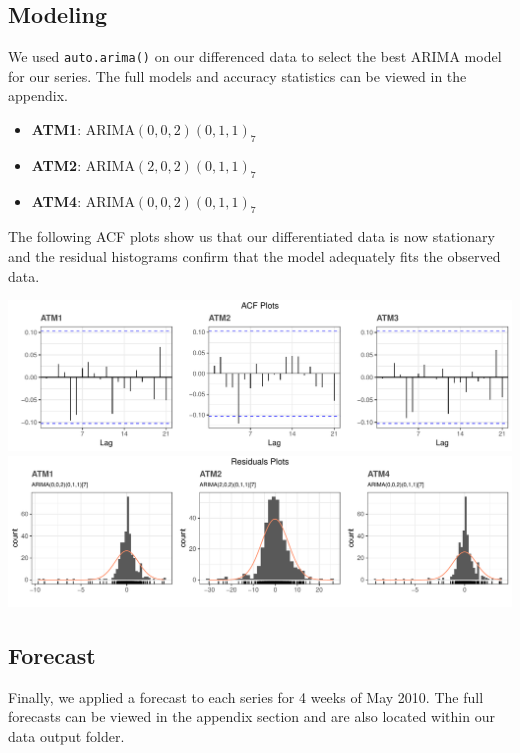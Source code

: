 \documentclass[openany]{book}
\providecommand{\tightlist}{%
  \setlength{\itemsep}{0pt}\setlength{\parskip}{0pt}}
\begin{document}
\hypertarget{modeling}{%
\subsection{Modeling}\label{modeling}}

We used \texttt{auto.arima()} on our differenced data to select the best
ARIMA model for our series. The full models and accuracy statistics can
be viewed in the appendix.

\begin{itemize}
\tightlist
\item
  \textbf{ATM1}: ARIMA\((0,0,2)(0,1,1)_7\)
\item
  \textbf{ATM2}: ARIMA\((2,0,2)(0,1,1)_7\)
\item
  \textbf{ATM4}: ARIMA\((0,0,2)(0,1,1)_7\)
\end{itemize}

The following ACF plots show us that our differentiated data is now
stationary and the residual histograms confirm that the model adequately
fits the observed data.

\includegraphics{Part-A-JM_files/figure-latex/unnamed-chunk-6-1.pdf}
\includegraphics{Part-A-JM_files/figure-latex/unnamed-chunk-6-2.pdf}

\hypertarget{forecast}{%
\subsection{Forecast}\label{forecast}}

Finally, we applied a forecast to each series for 4 weeks of May 2010.
The full forecasts can be viewed in the appendix section and are also
located within our data output folder.
\end{document}
